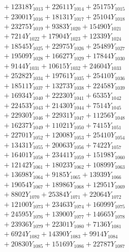 \documentclass[a4paper,10pt]{article}
\begin{document}
{\begin{align}
&\;  + 12318 Y_{1013} + 22611 Y_{1014} + 25175 Y_{1015} \\[0.3ex]
&\;  + 23001 Y_{1016} + 18131 Y_{1017} + 25104 Y_{1018} \\[0.5ex]\allowbreak
&\;  + 23275 Y_{1019} + 9383 Y_{1020} + 15490 Y_{1021} \\[0.3ex]
&\;  + 7214 Y_{1022} + 17904 Y_{1023} + 12339 Y_{1024} \\[0.3ex]
&\;  + 18545 Y_{1025} + 22975 Y_{1026} + 25489 Y_{1027} \\[0.3ex]
&\;  + 19509 Y_{1028} + 16627 Y_{1029} + 17844 Y_{1030} \\[0.3ex]
&\;  + 9144 Y_{1031} + 10615 Y_{1032} + 24604 Y_{1033} \\[0.3ex]
&\;  + 25282 Y_{1034} + 19761 Y_{1035} + 25410 Y_{1036} \\[0.3ex]
&\;  + 18511 Y_{1037} + 13273 Y_{1038} + 22458 Y_{1039} \\[0.3ex]
&\;  + 16934 Y_{1040} + 22230 Y_{1041} + 6535 Y_{1042} \\[0.3ex]
&\;  + 22453 Y_{1043} + 21430 Y_{1044} + 7514 Y_{1045} \\[0.3ex]
&\;  + 22930 Y_{1046} + 22931 Y_{1047} + 11256 Y_{1048} \\[0.5ex]\allowbreak
&\;  + 16237 Y_{1049} + 11021 Y_{1050} + 7415 Y_{1051} \\[0.3ex]
&\;  + 22701 Y_{1052} + 12008 Y_{1053} + 25410 Y_{1054} \\[0.3ex]
&\;  + 13431 Y_{1055} + 20063 Y_{1056} + 7422 Y_{1057} \\[0.3ex]
&\;  + 16401 Y_{1058} + 23441 Y_{1059} + 15198 Y_{1060} \\[0.3ex]
&\;  + 12142 Y_{1061} + 18023 Y_{1062} + 10899 Y_{1063} \\[0.3ex]
&\;  + 13698 Y_{1064} + 9185 Y_{1065} + 13939 Y_{1066} \\[0.3ex]
&\;  + 19054 Y_{1067} + 18986 Y_{1068} + 12951 Y_{1069} \\[0.3ex]
&\;  + 8802 Y_{1070} + 25384 Y_{1071} + 22064 Y_{1072} \\[0.3ex]
&\;  + 12100 Y_{1073} + 23463 Y_{1074} + 16099 Y_{1075} \\[0.3ex]
&\;  + 24595 Y_{1076} + 13900 Y_{1077} + 14665 Y_{1078} \\[0.5ex]\allowbreak
&\;  + 23936 Y_{1079} + 22301 Y_{1080} + 7136 Y_{1081} \\[0.3ex]
&\;  + 6924 Y_{1082} + 14390 Y_{1083} + 9914 Y_{1084} \\[0.3ex]
&\;  + 20830 Y_{1085} + 15169 Y_{1086} + 22787 Y_{1087} \\[0.3ex]

\end{align}}
\end{document}
